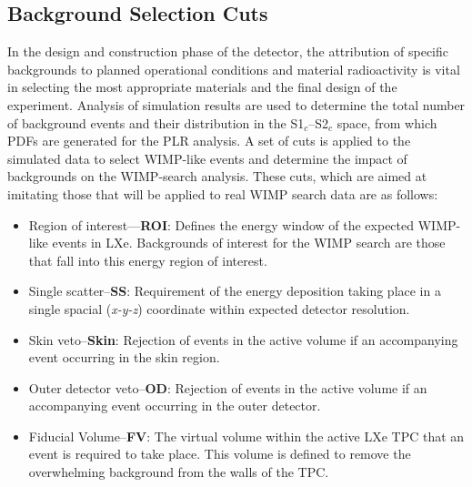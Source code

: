 \subsection{Background Selection Cuts}
\label{secsec:background_selection}

In the design and construction phase of the detector, the attribution of specific backgrounds to planned operational conditions and material radioactivity is vital in selecting the most appropriate materials and the final design of the experiment. Analysis of simulation results are used to determine the total number of background events and their distribution in the S1$_{c}$--S2$_{c}$ space, from which PDFs are generated for the PLR analysis. A set of cuts is applied to the simulated data to select WIMP-like events and determine the impact of backgrounds on the WIMP-search analysis. These cuts, which are aimed at imitating those that will be applied to real WIMP search data are as follows:

\begin{itemize}
  \item Region of interest---\textbf{ROI}: Defines the energy window of the expected WIMP-like events in LXe. Backgrounds of interest for the WIMP search are those that fall into this energy region of interest.
  
  \item Single scatter--\textbf{SS}: Requirement of the energy deposition taking place in a single spacial (\textit{x-y-z}) coordinate within expected detector resolution. 
  
  \item Skin veto--\textbf{Skin}: Rejection of events in the active volume if an accompanying event occurring in the skin region.
  
  \item Outer detector veto--\textbf{OD}: Rejection of events in the active volume if an accompanying event occurring in the outer detector.
  
  \item Fiducial Volume--\textbf{FV}: The virtual volume within the active LXe TPC that an event is required to take place. This volume is defined to remove the overwhelming background from the walls of the TPC.
\end{itemize}

